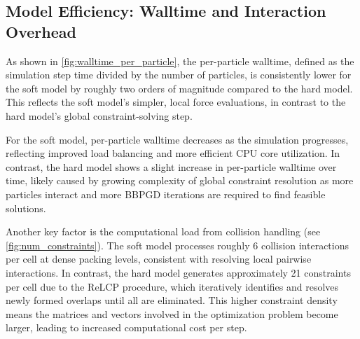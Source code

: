 \documentclass[conference]{IEEEtran}
\begin{document}
\subsection{Model Efficiency: Walltime and Interaction Overhead}
\label{sec:complexity_scalability}

As shown in \autoref{fig:walltime_per_particle}, the per-particle walltime, defined as the simulation step time divided by the number of particles, is consistently lower for the soft model by roughly two orders of magnitude compared to the hard model. This reflects the soft model's simpler, local force evaluations, in contrast to the hard model's global constraint-solving step.

For the soft model, per-particle walltime decreases as the simulation progresses, reflecting improved load balancing and more efficient CPU core utilization. In contrast, the hard model shows a slight increase in per-particle walltime over time, likely caused by growing complexity of global constraint resolution as more particles interact and more BBPGD iterations are required to find feasible solutions.

Another key factor is the computational load from collision handling (see \autoref{fig:num_constraints}). The soft model processes roughly 6 collision interactions per cell at dense packing levels, consistent with resolving local pairwise interactions. In contrast, the hard model generates approximately 21 constraints per cell due to the ReLCP procedure, which iteratively identifies and resolves newly formed overlaps until all are eliminated. This higher constraint density means the matrices and vectors involved in the optimization problem become larger, leading to increased computational cost per step.
\end{document}

